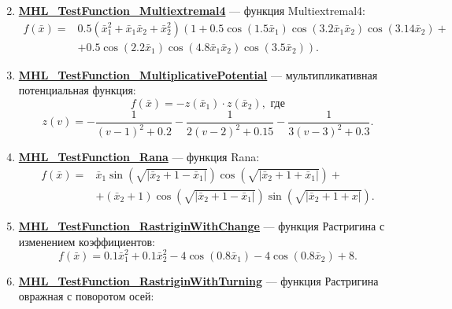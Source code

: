 \begin{enumerate}
\begin{equation}
 \end{equation}
 \item \hyperref[TestFunctions:section:MHL_TestFunction_Multiextremal4]{\textbf{MHL\_TestFunction\_Multiextremal4}} --- функция Multiextremal4:
 \begin{align}
 f\left( \bar{x}\right) =& 0.5\left( \bar{x}_1^2+\bar{x}_1\bar{x}_2 +\bar{x}_2^2\right) \left( 1+0.5\cos\left(1.5\bar{x}_1\right)\cos\left(3.2\bar{x}_1\bar{x}_2\right)\cos\left(3.14\bar{x}_2\right)  +\right. \\
  & \left.+0.5\cos\left(2.2\bar{x}_1\right)\cos\left(4.8\bar{x}_1\bar{x}_2\right)\cos\left(3.5\bar{x}_2\right)\right).\nonumber
 \end{align}
 \item \hyperref[TestFunctions:section:MHL_TestFunction_MultiplicativePotential]{\textbf{MHL\_TestFunction\_MultiplicativePotential}} --- мультипликативная потенциальная функция:
 \begin{equation}
 f\left( \bar{x}\right) = -z\left( \bar{x}_1\right)\cdot z\left( \bar{x}_2\right), \text{ где}
 \end{equation}
 \begin{equation*}
 z\left( v\right)= -\dfrac{1}{\left( v-1\right)^2+0.2 }-\dfrac{1}{2\left( v-2\right)^2+0.15}-\dfrac{1}{3\left( v-3\right)^2+0.3}.
 \end{equation*}
 \item \hyperref[TestFunctions:section:MHL_TestFunction_Rana]{\textbf{MHL\_TestFunction\_Rana}} --- функция Rana:
 \begin{align}
 f\left( \bar{x}\right) = & \bar{x}_1\sin\left( \sqrt{\left| \bar{x}_2+1-\bar{x}_1\right| }\right) \cos\left( \sqrt{\left| \bar{x}_2+1+\bar{x}_1\right| }\right)+  \\&+ (\bar{x}_2+1)\cos\left( \sqrt{\left| \bar{x}_2+1-\bar{x}_1\right| }\right) \sin\left( \sqrt{\left| \bar{x}_2+1+x\right| }\right).
 \end{align}
 \item \hyperref[TestFunctions:section:MHL_TestFunction_RastriginWithChange]{\textbf{MHL\_TestFunction\_RastriginWithChange}} --- функция Растригина с изменением коэффициентов:
 \begin{equation}
 f\left( \bar{x}\right) =0.1\bar{x}_1^2+0.1\bar{x}_2^2-4\cos\left( 0.8\bar{x}_1\right) -4\cos\left( 0.8\bar{x}_2\right) +8.
 \end{equation}
 \item \hyperref[TestFunctions:section:MHL_TestFunction_RastriginWithTurning]{\textbf{MHL\_TestFunction\_RastriginWithTurning}} --- функция Растригина овражная с поворотом осей:

\end{enumerate}
